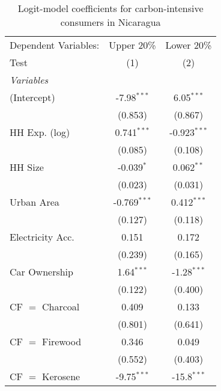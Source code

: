 
\begin{table}[htbp!]
   \centering
   \small
   \begin{adjustbox}{width = 1\textwidth, max height = 0.95\textheight, center}
      \begin{threeparttable}[b]
         \caption{\label{tab:Logit_1_NIC} Logit-model coefficients for carbon-intensive consumers in Nicaragua}
         \begin{tabular}{lcc}
            \tabularnewline \midrule \midrule
            Dependent Variables: & Upper 20\%     & Lower 20\%\\   
            Test                 & (1)            & (2)\\  
            \midrule
            \emph{Variables}\\
            (Intercept)          & -7.98$^{***}$  & 6.05$^{***}$\\   
                                 & (0.853)        & (0.867)\\   
            HH Exp. (log)        & 0.741$^{***}$  & -0.923$^{***}$\\   
                                 & (0.085)        & (0.108)\\   
            HH Size              & -0.039$^{*}$   & 0.062$^{**}$\\   
                                 & (0.023)        & (0.031)\\   
            Urban Area           & -0.769$^{***}$ & 0.412$^{***}$\\   
                                 & (0.127)        & (0.118)\\   
            Electricity Acc.     & 0.151          & 0.172\\   
                                 & (0.239)        & (0.165)\\   
            Car Ownership        & 1.64$^{***}$   & -1.28$^{***}$\\   
                                 & (0.122)        & (0.400)\\   
            CF $=$ Charcoal      & 0.409          & 0.133\\   
                                 & (0.801)        & (0.641)\\   
            CF $=$ Firewood      & 0.346          & 0.049\\   
                                 & (0.552)        & (0.403)\\   
            CF $=$ Kerosene      & -9.75$^{***}$  & -15.8$^{***}$\\   

\end{tabular}
\end{threeparttable}
\end{adjustbox}
\end{table}
